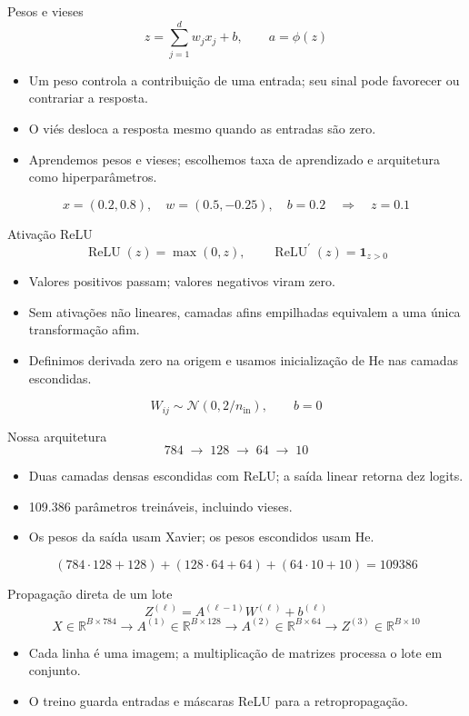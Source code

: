 \documentclass[aspectratio=169,10pt]{beamer}
\begin{document}
\begin{frame}{Pesos e vieses}
\[z=\sum_{j=1}^{d}w_jx_j+b,\qquad a=\phi(z)\]\begin{itemize}
\item Um peso controla a contribuição de uma entrada; seu sinal pode favorecer ou contrariar a resposta.
\item O viés desloca a resposta mesmo quando as entradas são zero.
\item Aprendemos pesos e vieses; escolhemos taxa de aprendizado e arquitetura como hiperparâmetros.
\end{itemize}
\[x=(0.2,0.8),\quad w=(0.5,-0.25),\quad b=0.2\quad\Rightarrow\quad z=0.1\]\end{frame}

\begin{frame}{Ativação ReLU}
\[\operatorname{ReLU}(z)=\max(0,z),\qquad \operatorname{ReLU}^{\prime}(z)=\mathbf{1}_{z>0}\]\begin{itemize}
\item Valores positivos passam; valores negativos viram zero.
\item Sem ativações não lineares, camadas afins empilhadas equivalem a uma única transformação afim.
\item Definimos derivada zero na origem e usamos inicialização de He nas camadas escondidas.
\end{itemize}
\[W_{ij}\sim\mathcal{N}(0,2/n_{\mathrm{in}}),\qquad b=0\]\end{frame}

\begin{frame}{Nossa arquitetura}
\[784\;\longrightarrow\;128\;\longrightarrow\;64\;\longrightarrow\;10\]\begin{itemize}
\item Duas camadas densas escondidas com ReLU; a saída linear retorna dez logits.
\item 109.386 parâmetros treináveis, incluindo vieses.
\item Os pesos da saída usam Xavier; os pesos escondidos usam He.
\end{itemize}
\[(784\cdot128+128)+(128\cdot64+64)+(64\cdot10+10)=109386\]\end{frame}

\begin{frame}{Propagação direta de um lote}
\[Z^{(\ell)}=A^{(\ell-1)}W^{(\ell)}+b^{(\ell)}\]\[X\in\mathbb{R}^{B\times784}\to A^{(1)}\in\mathbb{R}^{B\times128}\to A^{(2)}\in\mathbb{R}^{B\times64}\to Z^{(3)}\in\mathbb{R}^{B\times10}\]\begin{itemize}
\item Cada linha é uma imagem; a multiplicação de matrizes processa o lote em conjunto.
\item O treino guarda entradas e máscaras ReLU para a retropropagação.
\end{itemize}
\end{frame}
\end{document}
